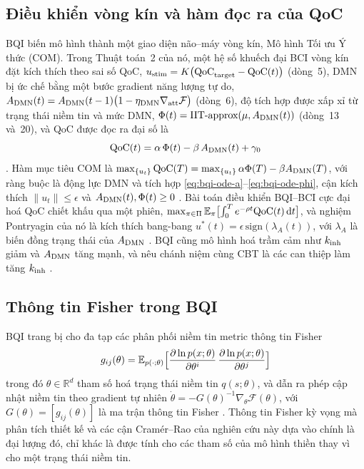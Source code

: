 \subsection{Điều khiển vòng kín và hàm đọc ra của QoC}
\label{sec:theory-com}
BQI biến mô hình thành một giao diện não--máy vòng kín, Mô hình Tối ưu Ý thức (COM). Trong Thuật toán~2 của nó, một hệ số khuếch đại BCI vòng kín đặt kích thích theo sai số QoC, $u_{\mathrm{stim}}=K\bigl(\mathrm{QoC}_{\mathrm{target}}-\mathrm{QoC}(t)\bigr)$ (dòng~5), DMN bị ức chế bằng một bước gradient năng lượng tự do, $A_{\mathrm{DMN}}(t)=A_{\mathrm{DMN}}(t-1)\bigl(1-\eta_{\mathrm{DMN}}\nabla_{\mathrm{att}}\mathcal F\bigr)$ (dòng~6), độ tích hợp được xấp xỉ từ trạng thái niềm tin và mức DMN, $\Phi(t)=\text{IIT-approx}(\mu,A_{\mathrm{DMN}}(t))$ (dòng~13 và~20), và QoC được đọc ra đại số là
\begin{equation}
  \mathrm{QoC}(t)=\alpha\,\Phi(t)-\beta\,A_{\mathrm{DMN}}(t)+\gamma_0
  \label{eq:bqi-readout}
\end{equation}
\cite[Mục~9.3, Thuật toán~2, dòng~21]{BQI}. Hàm mục tiêu COM là $\max_{\{u_t\}}\mathrm{QoC}(T)=\max_{\{u_t\}}\alpha\Phi(T)-\beta A_{\mathrm{DMN}}(T)$, với ràng buộc là động lực DMN và tích hợp \eqref{eq:bqi-ode-a}--\eqref{eq:bqi-ode-phi}, cận kích thích $\|u_t\|\le\epsilon$ và $A_{\mathrm{DMN}}(t),\Phi(t)\ge0$ \cite[Mục~9.4, pt.~(69)--(73)]{BQI}. Bài toán điều khiển BQI--BCI cực đại hoá QoC chiết khấu qua một phiên, $\max_{\pi\in\Pi}\mathbb E_\pi\bigl[\int_0^T e^{-\rho t}\mathrm{QoC}(t)\,\mathrm{d} t\bigr]$, và nghiệm Pontryagin của nó là kích thích bang-bang $u^*(t)=\epsilon\,\mathrm{sign}(\lambda_A(t))$, với $\lambda_A$ là biến đồng trạng thái của $A_{\mathrm{DMN}}$ \cite[Mục~10.1, pt.~(74)--(75)]{BQI}. BQI cũng mô hình hoá trầm cảm như $k_{\mathrm{inh}}$ giảm và $A_{\mathrm{DMN}}$ tăng mạnh, và nêu chánh niệm cùng CBT là các can thiệp làm tăng $k_{\mathrm{inh}}$ \cite[Bảng~10]{BQI}.

\subsection{Thông tin Fisher trong BQI}
\label{sec:theory-fisher}
BQI trang bị cho đa tạp các phân phối niềm tin metric thông tin Fisher
\begin{equation}
  g_{ij}(\theta)=\mathbb E_{p(\cdot;\theta)}\Bigl[\frac{\partial\ln p(x;\theta)}{\partial\theta^i}\,\frac{\partial\ln p(x;\theta)}{\partial\theta^j}\Bigr]
  \label{eq:bqi-fisher}
\end{equation}
trong đó $\theta\in\mathbb R^d$ tham số hoá trạng thái niềm tin $q(s;\theta)$, và dẫn ra phép cập nhật niềm tin theo gradient tự nhiên $\dot\theta=-G(\theta)^{-1}\nabla_\theta\mathcal F(\theta)$, với $G(\theta)=[g_{ij}(\theta)]$ là ma trận thông tin Fisher \cite[Mục~12.1, pt.~(79)--(80)]{BQI}. Thông tin Fisher kỳ vọng mà phân tích thiết kế và các cận Cramér--Rao của nghiên cứu này dựa vào chính là đại lượng đó, chỉ khác là được tính cho các tham số của mô hình thiền thay vì cho một trạng thái niềm tin.

